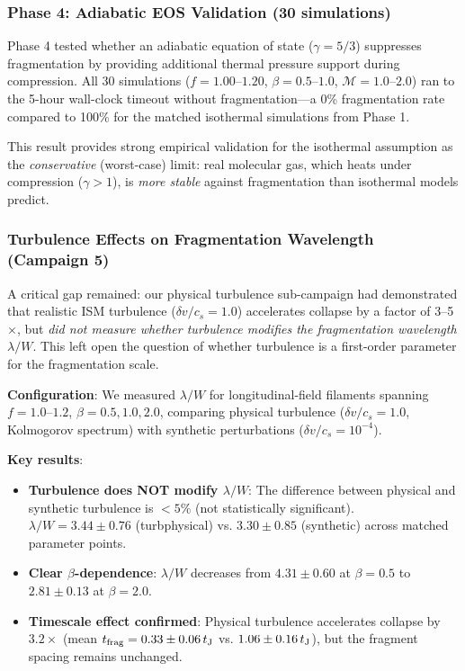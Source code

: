 \documentclass[twocolumn]{mnras}
\begin{document}
\subsubsection{Phase 4: Adiabatic EOS Validation (30 simulations)}

Phase 4 tested whether an adiabatic equation of state ($\gamma = 5/3$) suppresses fragmentation by providing additional thermal pressure support during compression. All 30 simulations ($f = 1.00$--$1.20$, $\beta = 0.5$--$1.0$, $\mathcal{M} = 1.0$--$2.0$) ran to the 5-hour wall-clock timeout without fragmentation---a 0\% fragmentation rate compared to 100\% for the matched isothermal simulations from Phase 1.

This result provides strong empirical validation for the isothermal assumption as the {\it conservative} (worst-case) limit: real molecular gas, which heats under compression ($\gamma > 1$), is {\it more stable} against fragmentation than isothermal models predict.

\subsubsection{Turbulence Effects on Fragmentation Wavelength (Campaign 5)}

A critical gap remained: our physical turbulence sub-campaign had demonstrated that realistic ISM turbulence ($\delta v/c_s = 1.0$) accelerates collapse by a factor of 3--5$\times$, but \textit{did not measure whether turbulence modifies the fragmentation wavelength $\lambda/W$}. This left open the question of whether turbulence is a first-order parameter for the fragmentation scale.

\textbf{Configuration}: We measured $\lambda/W$ for longitudinal-field filaments spanning $f = 1.0$--$1.2$, $\beta = 0.5, 1.0, 2.0$, comparing physical turbulence ($\delta v/c_s = 1.0$, Kolmogorov spectrum) with synthetic perturbations ($\delta v/c_s = 10^{-4}$).

\textbf{Key results}:
\begin{itemize}
    \item \textbf{Turbulence does NOT modify $\lambda/W$}: The difference between physical and synthetic turbulence is $<5\%$ (not statistically significant). $\lambda/W = 3.44 \pm 0.76$ (turbphysical) vs. $3.30 \pm 0.85$ (synthetic) across matched parameter points.
    \item \textbf{Clear $\beta$-dependence}: $\lambda/W$ decreases from $4.31 \pm 0.60$ at $\beta = 0.5$ to $2.81 \pm 0.13$ at $\beta = 2.0$.
    \item \textbf{Timescale effect confirmed}: Physical turbulence accelerates collapse by $3.2\times$ (mean $t_{\rm frag} = 0.33 \pm 0.06\,t_{\rm J}$ vs. $1.06 \pm 0.16\,t_{\rm J}$), but the fragment spacing remains unchanged.
\end{itemize}
\end{document}
